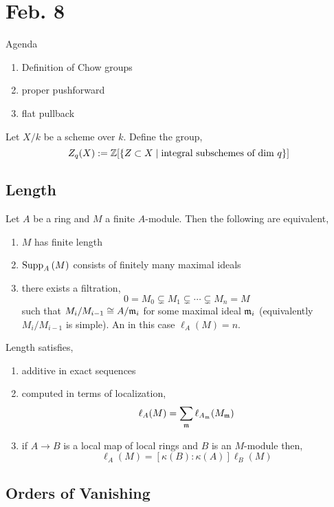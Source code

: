 \documentclass[12pt]{article}
\begin{document}
\section{Feb. 8}

Agenda 

\begin{enumerate}
\item Definition of Chow groups
\item proper pushforward
\item flat pullback 
\end{enumerate}

\begin{defn}
Let $X / k$ be a scheme over $k$. Define the group,
\[ Z_q(X) := \mathbb{Z} [ \{ Z \subset X \mid \text{integral subschemes of dim } q \}] \]
\end{defn}

\subsection{Length}

\begin{prop}
Let $A$ be a ring and $M$ a finite $A$-module. Then the following are equivalent,
\begin{enumerate}
\item $M$ has finite length
\item $\mathrm{Supp}_{A}\left(M \right)$ consists of finitely many maximal ideals 
\item there exists a filtration,
\[ 0 = M_0 \subsetneq M_1 \subsetneq \cdots \subsetneq M_n = M \]
such that $M_{i} / M_{i-1} \cong A / \mathfrak{m}_i$ for some maximal ideal $\mathfrak{m}_i$ (equivalently $M_i / M_{i-1}$ is simple). An in this case $\ell_A(M) = n$.
\end{enumerate}
\end{prop}

\begin{prop}
Length satisfies,
\begin{enumerate}
\item additive in exact sequences
\item computed in terms of localization,
\[ \ell_A(M) = \sum_{\mathfrak{m}} \ell_{A_{\mathfrak{m}}}(M_{\mathfrak{m}}) \]
\item if $A \to B$ is a local map of local rings and $B$ is an $M$-module then,
\[ \ell_A(M) = [\kappa(B) : \kappa(A)] \ell_B(M) \]
\end{enumerate}
\end{prop}

\subsection{Orders of Vanishing}
\end{document}
